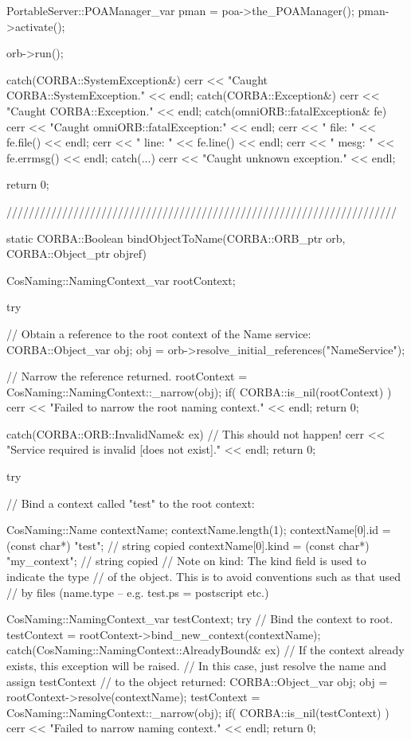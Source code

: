 \documentclass[11pt,twoside,a4paper]{book}
\begin{document}
\begin{cxxlisting}
{{    PortableServer::POAManager_var pman = poa->the_POAManager();
    pman->activate();

    orb->run();
  }
  catch(CORBA::SystemException&) {
    cerr << "Caught CORBA::SystemException." << endl;
  }
  catch(CORBA::Exception&) {
    cerr << "Caught CORBA::Exception." << endl;
  }
  catch(omniORB::fatalException& fe) {
    cerr << "Caught omniORB::fatalException:" << endl;
    cerr << "  file: " << fe.file() << endl;
    cerr << "  line: " << fe.line() << endl;
    cerr << "  mesg: " << fe.errmsg() << endl;
  }
  catch(...) {
    cerr << "Caught unknown exception." << endl;
  }

  return 0;
}

//////////////////////////////////////////////////////////////////////

static CORBA::Boolean
bindObjectToName(CORBA::ORB_ptr orb, CORBA::Object_ptr objref)
{
  CosNaming::NamingContext_var rootContext;

  try {
    // Obtain a reference to the root context of the Name service:
    CORBA::Object_var obj;
    obj = orb->resolve_initial_references("NameService");

    // Narrow the reference returned.
    rootContext = CosNaming::NamingContext::_narrow(obj);
    if( CORBA::is_nil(rootContext) ) {
      cerr << "Failed to narrow the root naming context." << endl;
      return 0;
    }
  }
  catch(CORBA::ORB::InvalidName& ex) {
    // This should not happen!
    cerr << "Service required is invalid [does not exist]." << endl;
    return 0;
  }

  try {
    // Bind a context called "test" to the root context:

    CosNaming::Name contextName;
    contextName.length(1);
    contextName[0].id   = (const char*) "test";       // string copied
    contextName[0].kind = (const char*) "my_context"; // string copied
    // Note on kind: The kind field is used to indicate the type
    // of the object. This is to avoid conventions such as that used
    // by files (name.type -- e.g. test.ps = postscript etc.)

    CosNaming::NamingContext_var testContext;
    try {
      // Bind the context to root.
      testContext = rootContext->bind_new_context(contextName);
    }
    catch(CosNaming::NamingContext::AlreadyBound& ex) {
      // If the context already exists, this exception will be raised.
      // In this case, just resolve the name and assign testContext
      // to the object returned:
      CORBA::Object_var obj;
      obj = rootContext->resolve(contextName);
      testContext = CosNaming::NamingContext::_narrow(obj);
      if( CORBA::is_nil(testContext) ) {
        cerr << "Failed to narrow naming context." << endl;
        return 0;
      }
    }

}}
\end{cxxlisting}
\end{document}
